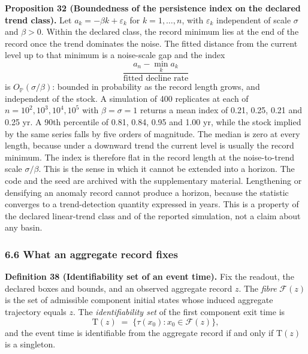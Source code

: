 \documentclass[11pt]{article}
\begin{document}
\textbf{Proposition 32 (Boundedness of the persistence index on the declared trend class).} Let \(a_k=-\beta k+\varepsilon_k\) for \(k=1,\dots,n\), with \(\varepsilon_k\) independent of scale \(\sigma\) and \(\beta>0\). Within the declared class, the record minimum lies at the end of the record once the trend dominates the noise. The fitted distance from the current level up to that minimum is a noise-scale gap and the index \[ \frac{a_n-\min_ka_k}{\text{fitted decline rate}} \] is \(O_{\mathbb P}(\sigma/\beta)\): bounded in probability as the record length grows, and independent of the stock. A simulation of 400 replicates at each of \(n=10^2,10^3,10^4,10^5\) with \(\beta=\sigma=1\) returns a mean index of 0.21, 0.25, 0.21 and 0.25 yr. A 90th percentile of 0.81, 0.84, 0.95 and 1.00 yr, while the stock implied by the same series falls by five orders of magnitude. The median is zero at every length, because under a downward trend the current level is usually the record minimum. The index is therefore flat in the record length at the noise-to-trend scale \(\sigma/\beta\). This is the sense in which it cannot be extended into a horizon. The code and the seed are archived with the supplementary material. Lengthening or densifying an anomaly record cannot produce a horizon, because the statistic converges to a trend-detection quantity expressed in years. This is a property of the declared linear-trend class and of the reported simulation, not a claim about any basin.



\subsubsection{6.6 What an aggregate record fixes}\label{what-an-aggregate-record-fixes}

\textbf{Definition 38 (Identifiability set of an event time).} Fix the readout, the declared boxes and
bounds, and an observed aggregate record \(z\). The \emph{fibre} \(\mathcal F(z)\) is the set of admissible
component initial states whose induced aggregate trajectory equals \(z\). The \emph{identifiability set} of
the first component exit time is
\[
\mathrm T(z) \;=\; \bigl\{\tau(x_0) : x_0 \in \mathcal F(z)\bigr\},
\]
and the event time is identifiable from the aggregate record if and only if \(\mathrm T(z)\) is a
singleton.
\end{document}
